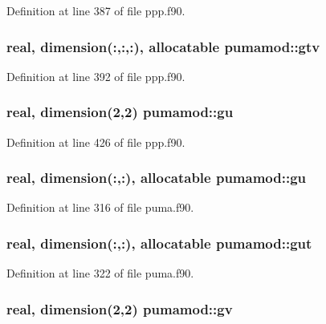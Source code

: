 \-Definition at line 387 of file ppp.\-f90.

\hypertarget{classpumamod_a24ec113507c8c09685e26fdf2ad94948}{
\subsubsection[{gtv}]{\setlength{\rightskip}{0pt plus 5cm}real, dimension(\-:,\-:,\-:), allocatable {\bf pumamod\-::gtv}}}
\label{classpumamod_a24ec113507c8c09685e26fdf2ad94948}


\-Definition at line 392 of file ppp.\-f90.

\hypertarget{classpumamod_af0504dba05d1852caaa89cc26864d4c1}{
\subsubsection[{gu}]{\setlength{\rightskip}{0pt plus 5cm}real, dimension(2,2) {\bf pumamod\-::gu}}}
\label{classpumamod_af0504dba05d1852caaa89cc26864d4c1}


\-Definition at line 426 of file ppp.\-f90.

\hypertarget{classpumamod_aaed48b35d778e5c3095fcd1083bbe804}{
\subsubsection[{gu}]{\setlength{\rightskip}{0pt plus 5cm}real, dimension(\-:,\-:), allocatable {\bf pumamod\-::gu}}}
\label{classpumamod_aaed48b35d778e5c3095fcd1083bbe804}


\-Definition at line 316 of file puma.\-f90.

\hypertarget{classpumamod_a54c30e8bd1e5b308c4111eaac995f578}{
\subsubsection[{gut}]{\setlength{\rightskip}{0pt plus 5cm}real, dimension(\-:,\-:), allocatable {\bf pumamod\-::gut}}}
\label{classpumamod_a54c30e8bd1e5b308c4111eaac995f578}


\-Definition at line 322 of file puma.\-f90.

\hypertarget{classpumamod_a2c2f72279b235e6fabc99913fed1f718}{
\subsubsection[{gv}]{\setlength{\rightskip}{0pt plus 5cm}real, dimension(2,2) {\bf pumamod\-::gv}}}
\label{classpumamod_a2c2f72279b235e6fabc99913fed1f718}


